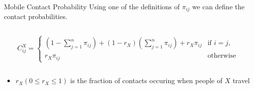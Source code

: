 \begin{slide}{Mobile Contact Probability}
Using one of the definitions of $\pi_{ij}$ we can define the contact probabilities.
\begin{columns}[T]
\begin{column}{.7\textwidth}
	\begin{definition}
		$$ C_{ij}^X =
		\begin{cases}
			(1 - \sum_{j=1}^n \pi_{ij}) + (1 - r_X)( \sum_{j=1}^n \pi_{ij} ) + r_X \pi_{ij} &	\text{if } i = j, \\
			r_X \pi_{ij}				&	\text{otherwise}
		\end{cases} $$
	\end{definition}
\end{column}
\end{columns}
\vfill
\begin{itemize}
	\item $r_X (0 \leq r_X \leq 1)$ is the fraction of contacts occuring when people of $X$ travel
\end{itemize}
\end{slide}